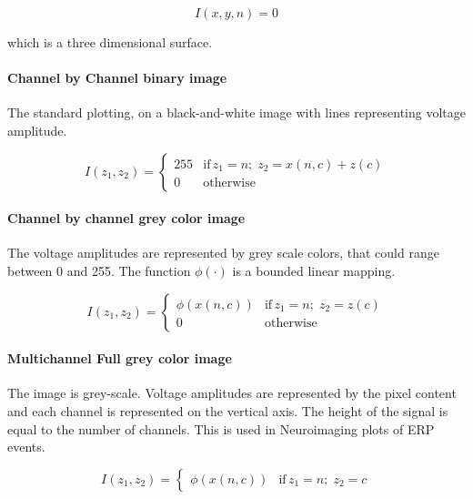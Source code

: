 \begin{equation}
I(x,y,n) = 0
\label{eq:standarizedaverages}
\end{equation}

which is a three dimensional surface.

\paragraph{Channel by Channel binary image }

The standard plotting, on a black-and-white image with lines representing voltage amplitude.

\begin{equation}
I(z_1,z_2) = \left\{ \begin{array}{rl}
255 & \text{if} \,  z_1 =  n; \; z_2 = x(n,c) + z(c) \\
0   & \mbox{otherwise}
\end{array}\right.
\label{eq:images}
\end{equation}

\paragraph{Channel by channel grey color image}

The voltage amplitudes are represented by grey scale colors, that could range between 0 and 255.  The function $\phi( \cdot )$ is a bounded linear mapping.

\begin{equation}
I(z_1,z_2) = \left\{ \begin{array}{rl}
\phi(x(n,c)) & \text{if} \,  z_1 = n; \; z_2 = z(c) \\
0   & \mbox{otherwise}
\end{array}\right.
\label{eq:images}
\end{equation}

\paragraph{Multichannel Full grey color image}

The image is grey-scale. Voltage amplitudes are represented by the pixel content and each channel is represented on the vertical axis.  The height of the signal is equal to the number of channels.   This is used in Neuroimaging plots of ERP events.

\begin{equation}
I(z_1,z_2) = \left\{ \begin{array}{rl} \phi(x(n,c))  & \text{if} \,  z_1 = n; \; z_2 = c \end{array}\right.
\label{eq:images}
\end{equation}


